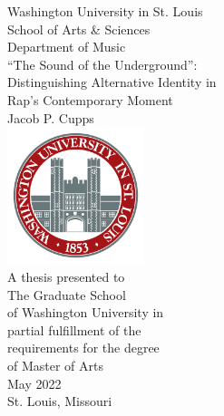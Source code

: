 \begin{titlepage}
    \begin{center}
        \small Washington University in St. Louis \\
                   School of Arts \& Sciences \\
                       Department of Music \\
        \vspace*{1.25in}
        \Large   ``The Sound of the Underground'': \\
        \vspace{0.1cm}
        \large   Distinguishing Alternative Identity in \\ 
                      Rap's Contemporary Moment  \\
        \vspace{0.5cm}
        \normalsize      Jacob P. Cupps \\
        \vfill
        \includegraphics[width=0.3\textwidth]{images/misc/header_logo.png} \\
        \vspace{0.8cm}
        \small A thesis presented to \\ 
                The Graduate School \\ 
             of Washington University in \\ 
             partial fulfillment of the \\ 
             requirements for the degree \\ 
                 of Master of Arts \\
        \vspace{0.8cm}
        \normalsize May 2022 \\
        St. Louis, Missouri
    \end{center}
\end{titlepage}
